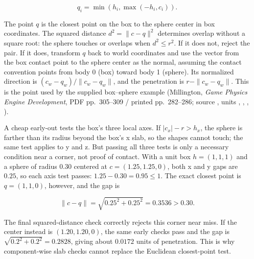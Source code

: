 \[
q_i=\min(h_i,\max(-h_i,c_i)).
\]

The point \(q\) is the closest point on the box to the sphere center in box coordinates. The squared distance \(d^2=\|c-q\|^2\) determines overlap without a square root: the sphere touches or overlaps when \(d^2\le r^2\). If it does not, reject the pair. If it does, transform \(q\) back to world coordinates and use the vector from the box contact point to the sphere center as the normal, assuming the contact convention points from body 0 (box) toward body 1 (sphere). Its normalized direction is \((c_w-q_w)/\|c_w-q_w\|\), and the penetration is \(r-\|c_w-q_w\|\). This is the point used by the supplied box--sphere example (Millington, \emph{Game Physics Engine Development}, PDF pp.~305--309 / printed pp.~282--286; source , units , , , ).

A cheap early-out tests the box's three local axes. If \(|c_x|-r>h_x\), the sphere is farther than its radius beyond the box's x slab, so the shapes cannot touch; the same test applies to y and z. But passing all three tests is only a necessary condition near a corner, not proof of contact. With a unit box \(h=(1,1,1)\) and a sphere of radius \(0.30\) centered at \(c=(1.25,1.25,0)\), both x and y gaps are \(0.25\), so each axis test passes: \(1.25-0.30=0.95\le1\). The exact closest point is \(q=(1,1,0)\), however, and the gap is

\[
\|c-q\|=\sqrt{0.25^2+0.25^2}=0.3536>0.30.
\]

The final squared-distance check correctly rejects this corner near miss. If the center instead is \((1.20,1.20,0)\), the same early checks pass and the gap is \(\sqrt{0.2^2+0.2^2}=0.2828\), giving about \(0.0172\) units of penetration. This is why component-wise slab checks cannot replace the Euclidean closest-point test.

